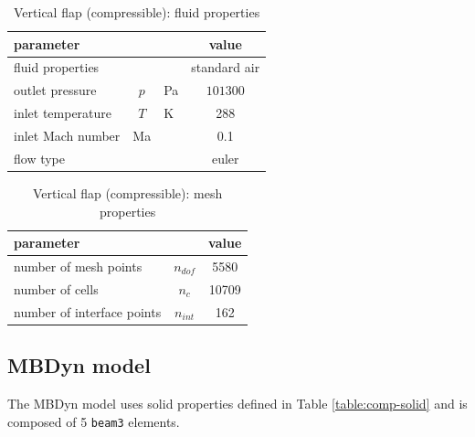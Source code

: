 \begin{table}[!htb]
	\begin{center}
		\begin{tabular}{ l c l | c } 
			parameter & & & value  \\ 
			\hline
			fluid properties  &  &  & standard air   \\
			outlet pressure & $p$& \si{Pa} & $101300$  \\
			inlet temperature & $T$ & \si{K} & 288  \\
			inlet Mach number &  Ma &  & 0.1 \\
			flow type & & & euler \\
		\end{tabular}
	\end{center}
	\caption{Vertical flap (compressible): fluid properties}
	\label{table:comp-fluid}
\end{table}



\begin{table}[!htb]
	\begin{center}
		\begin{tabular}{ l c | c } 
			parameter & & value   \\ 
			\hline
			number of mesh points  & $n_{dof}$ & 5580     \\
			number of cells & $n_c$ & 10709  \\
			number of interface points  & $n_{int}$ & 162  \\			
		\end{tabular}
	\end{center}
	\caption{Vertical flap (compressible): mesh properties}
	\label{table:comp-mesh}
\end{table}


\subsection{MBDyn model}


The MBDyn model uses solid properties defined in Table \ref{table:comp-solid} and is composed of 5 \texttt{beam3} elements. 

